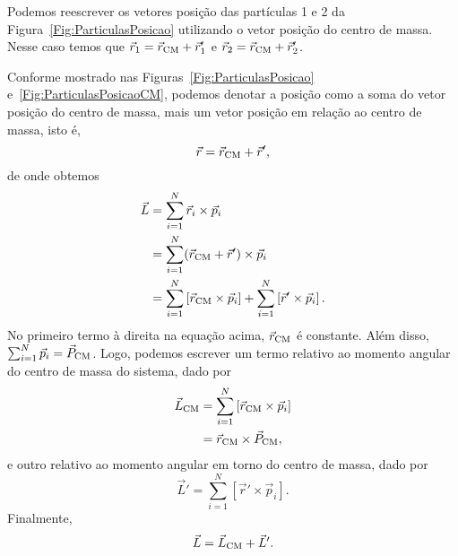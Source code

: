 \begin{marginfigure}
\centering
{}
\caption{Podemos reescrever os vetores posição das partículas 1 e 2 da Figura~\ref{Fig:ParticulasPosicao} utilizando o vetor posição do centro de massa. Nesse caso temos que $\vec{r}_1 = \vec{r}_{\rm{CM}} + \vec{r}'_1$ e $\vec{r}_2 = \vec{r}_{\rm{CM}} + \vec{r}'_2$.\label{Fig:ParticulasPosicaoCM}}
\end{marginfigure}

Conforme mostrado nas Figuras~\ref{Fig:ParticulasPosicao} e~\ref{Fig:ParticulasPosicaoCM}, podemos denotar a posição como a soma do vetor posição do centro de massa, mais um vetor posição em relação ao centro de massa, isto é,
\begin{equation}
    \vec{r} = \vec{r}_{\rm{CM}} + \vec{r}',
\end{equation}
%
de onde obtemos
\begin{align}
    \vec{L} &= \sum_{i=1}^N \vec{r}_i \times \vec{p}_i \\
    &= \sum_{i=1}^N (\vec{r}_{\rm{CM}} + \vec{r}') \times \vec{p}_i \\
    &= \sum_{i=1}^N \left[\vec{r}_{\rm{CM}} \times \vec{p}_i\right] + \sum_{i=1}^N \left[\vec{r}' \times \vec{p}_i\right].
\end{align}
%
No primeiro termo à direita na equação acima, $\vec{r}_{\rm{CM}}$ é constante. Além disso, $\sum_{i=1}^N \vec{p}_i = \vec{P}_{\rm{CM}}$. Logo, podemos escrever um termo relativo ao momento angular do centro de massa do sistema, dado por
\begin{align}
    \vec{L}_{\rm{CM}} &= \sum_{i=1}^N \left[\vec{r}_{\rm{CM}} \times \vec{p}_i\right] \\
    &= \vec{r}_{\rm{CM}} \times \vec{P}_{\rm{CM}},
\end{align}
%
e outro relativo ao momento angular em torno do centro de massa, dado por
\begin{equation}
    \vec{L}' = \sum_{i=1}^N \left[\vec{r}' \times \vec{p}_i\right].
\end{equation}
%
Finalmente,
\begin{equation}
    \vec{L} = \vec{L}_{\rm{CM}} + \vec{L}'.
\end{equation}

